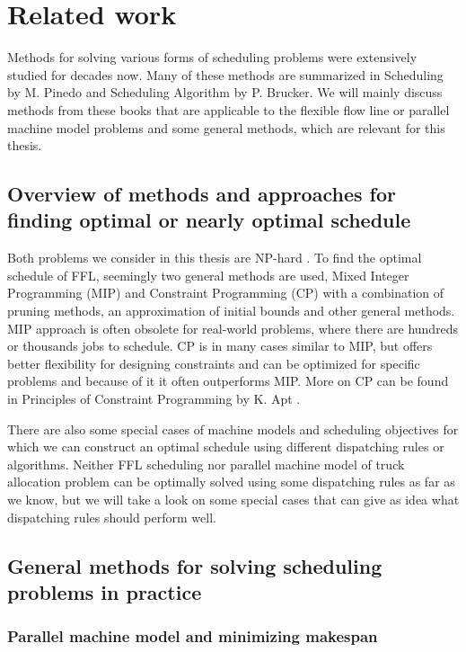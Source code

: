 \documentclass{ctuthesis}
\begin{document}
\chapter{Related work}
\label{chap:Related work}
Methods for solving various forms of scheduling problems were extensively studied for decades now. Many of these methods are summarized in Scheduling by M. Pinedo \cite{pinedo} and Scheduling Algorithm by P. Brucker\cite{bucker}. We will mainly discuss methods from these books that are applicable to the flexible flow line or parallel machine model problems and some general methods, which are relevant for this thesis. 

\section{Overview of methods and approaches for finding optimal or nearly optimal schedule}

Both problems we consider in this thesis are NP-hard \cite{pinedo}. To find the optimal schedule of FFL, seemingly two general methods are used, Mixed Integer Programming (MIP) and Constraint Programming (CP) with a combination of pruning methods, an approximation of initial bounds and other general methods. MIP approach is often obsolete for real-world problems, where there are hundreds or thousands jobs to schedule. CP is in many cases similar to MIP, but offers better flexibility for designing constraints and can be optimized for specific problems and because of it it often outperforms MIP. More on CP can be found in Principles of Constraint Programming by K. Apt \cite{cp}.

There are also some special cases of machine models and scheduling objectives for which we can construct an optimal schedule using different dispatching rules or algorithms. Neither FFL scheduling nor parallel machine model of truck allocation problem can be optimally solved using some dispatching rules as far as we know, but we will take a look on some special cases that can give as idea what dispatching rules should perform well.

\section{General methods for solving scheduling problems in practice}

\subsection{Parallel machine model and minimizing makespan}
\end{document}
